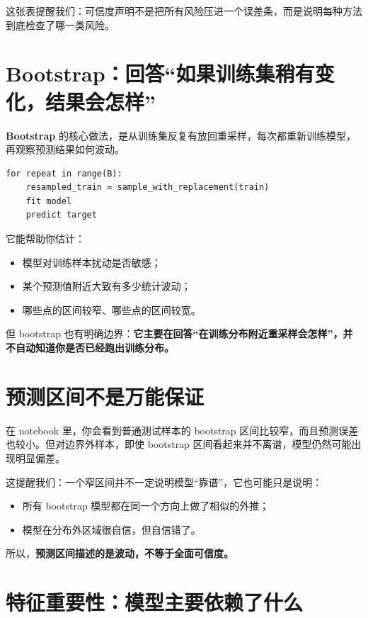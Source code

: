 这张表提醒我们：可信度声明不是把所有风险压进一个误差条，而是说明每种方法到底检查了哪一类风险。

\section{Bootstrap：回答“如果训练集稍有变化，结果会怎样”}

\textbf{Bootstrap} 的核心做法，是从训练集反复有放回重采样，每次都重新训练模型，再观察预测结果如何波动。

\begin{examplebox}
\begin{lstlisting}[style=pythonstyle]
for repeat in range(B):
    resampled_train = sample_with_replacement(train)
    fit model
    predict target
\end{lstlisting}
\end{examplebox}

它能帮助你估计：

\begin{itemize}
    \item 模型对训练样本扰动是否敏感；
    \item 某个预测值附近大致有多少统计波动；
    \item 哪些点的区间较窄、哪些点的区间较宽。
\end{itemize}

但 bootstrap 也有明确边界：\textbf{它主要在回答“在训练分布附近重采样会怎样”，并不自动知道你是否已经跑出训练分布。}

\section{预测区间不是万能保证}

在 notebook 里，你会看到普通测试样本的 bootstrap 区间比较窄，而且预测误差也较小。但对边界外样本，即使 bootstrap 区间看起来并不离谱，模型仍然可能出现明显偏差。

这提醒我们：一个窄区间并不一定说明模型“靠谱”，它也可能只是说明：

\begin{itemize}
    \item 所有 bootstrap 模型都在同一个方向上做了相似的外推；
    \item 模型在分布外区域很自信，但自信错了。
\end{itemize}

所以，\textbf{预测区间描述的是波动，不等于全面可信度。}

\section{特征重要性：模型主要依赖了什么}


